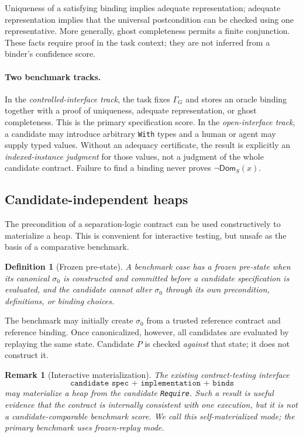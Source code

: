 \documentclass[10pt]{article}
\newtheorem{definition}{Definition}
\newtheorem{remark}{Remark}
\begin{document}
Uniqueness of a satisfying binding implies adequate representation; adequate
representation implies that the universal postcondition can be checked using
one representative.  More generally, ghost completeness permits a finite
conjunction.  These facts require proof in the task context; they are not
inferred from a binder's confidence score.

\paragraph{Two benchmark tracks.}
In the \emph{controlled-interface track}, the task fixes $\Gamma_G$ and stores
an oracle binding together with a proof of uniqueness, adequate
representation, or ghost completeness.  This is the primary specification
score.  In the \emph{open-interface track}, a candidate may introduce
arbitrary \texttt{With} types and a human or agent may supply typed values.
Without an adequacy certificate, the result is explicitly an
\emph{indexed-instance judgment} for those values, not a judgment of the
whole candidate contract.  Failure to find a binding never proves
$\neg\mathsf{Dom}_S(x)$.

\subsection{Candidate-independent heaps}
\label{sec:fixedheap}

The precondition of a separation-logic contract can be used constructively to
materialize a heap.  This is convenient for interactive testing, but unsafe as
the basis of a comparative benchmark.

\begin{definition}[Frozen pre-state]
A benchmark case has a frozen pre-state when its canonical $\sigma_0$ is
constructed and committed before a candidate specification is evaluated, and
the candidate cannot alter $\sigma_0$ through its own precondition,
definitions, or binding choices.
\end{definition}

The benchmark may initially create $\sigma_0$ from a trusted reference
contract and reference binding.  Once canonicalized, however, all candidates
are evaluated by replaying the same state.  Candidate $P$ is checked
\emph{against} that state; it does not construct it.

\begin{remark}[Interactive materialization]
The existing contract-testing interface
\[
  \texttt{candidate spec + implementation + binds}
\]
may materialize a heap from the candidate \texttt{Require}.  Such a result is
useful evidence that the contract is internally consistent with one execution,
but it is not a candidate-comparable benchmark score.  We call this
\emph{self-materialized mode}; the primary benchmark uses \emph{frozen-replay
mode}.
\end{remark}
\end{document}

